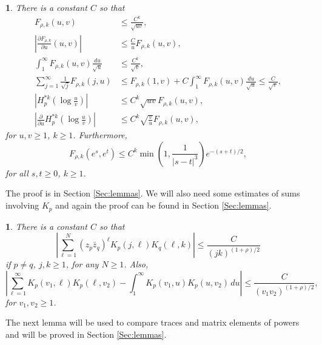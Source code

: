 \documentclass{article}
\numberwithin{equation}{section}
\numberwithin{figure}{section}
\theoremstyle{plain}
\theoremstyle{plain}
\newtheorem{lemma}[thm]{\protect\lemmaname}
\numberwithin{thm}{section}
\theoremstyle{remark}
\providecommand{\lemmaname}{Lemma}
\let \le \leqslant
\let \ge \geqslant
\begin{document}
\begin{lemma}\label{Lem:Frhok}
There is a constant $C$ so that
\begin{align}\label{Frhok1}
F_{\rho,k}(u,v)&\le \frac{C^k}{\sqrt{uv}},
\\
\label{Frhok3}
\left|\frac{\partial F_{\rho,k}}{\partial u}(u,v)\right|&\le \frac{C}{u}F_{\rho,k}(u,v),\\
\label{Frhok4}
\int_1^\infty F_{\rho,k}(u,v)\frac{du}{\sqrt{u}}&\le\frac{C^k}{\sqrt{v}},\\
\label{Frhok5}
\sum_{j=1}^\infty\frac{1}{\sqrt{j}}F_{\rho,k}(j,u)&\le F_{\rho,k}(1,v)+C\int_1^\infty F_{\rho,k}(u,v)\frac{du}{\sqrt{u}}\le\frac{C}{\sqrt{v}},\\
\label{Frhok6}
\left|H_p^{*k}(\log\frac uv)\right|&\le C^k\sqrt{uv}F_{\rho,k}(u,v),
\\
\label{Frhok7}
\left|\frac{\partial}{\partial u}H_p^{*k}(\log\frac uv)\right|&\le C^k\sqrt{\frac{v}{u}}F_{\rho,k}(u,v),
\end{align}
for $u,v\ge 1$, $k\ge 1$. Furthermore,
\begin{equation}\label{Frhok2}
F_{\rho,k}(e^{s},e^{t})\le C^k\min(1,\frac 1{|s-t|^3})e^{-(s+t)/2},
\end{equation}
for all $s,t\ge 0$, $k\ge 1$.
\end{lemma}

The proof is in Section \ref{Sec:lemmas}. We will also need some estimates of sums involving $K_p$ and again the proof can be found in Section \ref{Sec:lemmas}.

\begin{lemma}\label{Lem:Kpest}
There is a constant $C$ so that
\begin{equation}\label{Kpest1}
\left|\sum_{\ell=1}^N(z_p\bar{z}_q)^\ell K_p(j,\ell)K_q(\ell,k)\right|\le\frac C{(jk)^{(1+\rho)/2}}
\end{equation}
if $p\neq q$, $j,k\ge 1$, for any $N\ge 1$. Also,
\begin{equation}\label{Kpest2}
\left|\sum_{\ell=1}^\infty K_p(v_1,\ell)K_p(\ell,v_2)-\int_1^\infty K_p(v_1,u)K_p(u,v_2)\,du\right|\le\frac C{(v_1v_2)^{(1+\rho)/2}},
\end{equation}
for $v_1,v_2\ge 1$.
\end{lemma}

The next lemma will be used to compare traces and matrix elements of powers and will be proved in Section \ref{Sec:lemmas}.
\end{document}
